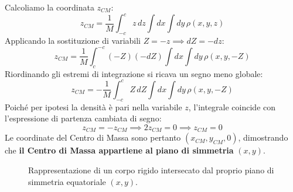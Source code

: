 Calcoliamo la coordinata $z_{CM}$:
\begin{equation}
    z_{CM} = \frac{1}{M} \int_{-c}^{c} z \, dz \int dx \int dy \, \rho(x,y,z)
\end{equation}
Applicando la sostituzione di variabili $Z = -z \implies dZ = -dz$:
\begin{equation}
    z_{CM} = \frac{1}{M} \int_{c}^{-c} (-Z) (-dZ) \int dx \int dy \, \rho(x,y,-Z)
\end{equation}
Riordinando gli estremi di integrazione si ricava un segno meno globale:
\begin{equation}
    z_{CM} = - \frac{1}{M} \int_{-c}^{c} Z \, dZ \int dx \int dy \, \rho(x,y,-Z)
\end{equation}
Poiché per ipotesi la densità è pari nella variabile $z$, l'integrale coincide con l'espressione di partenza cambiata di segno:
\begin{equation}
    z_{CM} = - z_{CM} \implies 2z_{CM} = 0 \implies z_{CM} = 0
\end{equation}
Le coordinate del Centro di Massa sono pertanto $(x_{CM}, y_{CM}, 0)$, dimostrando che \textbf{il Centro di Massa appartiene al piano di simmetria} $(x,y)$.

\begin{figure}[ht]
    \centering
    \caption{Rappresentazione di un corpo rigido intersecato dal proprio piano di simmetria equatoriale $(x,y)$.}
\end{figure}

